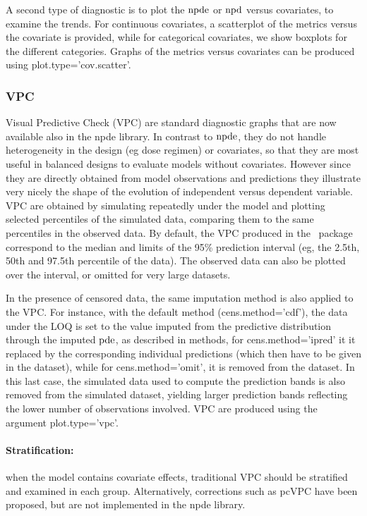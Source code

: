A second type of diagnostic is to plot the ${\rm npde}$ or ${\rm npd}$ versus covariates, to examine the trends. For 
continuous covariates, a scatterplot of the metrics versus the covariate is provided, while for categorical 
covariates, we show boxplots for the different categories. Graphs of the metrics versus covariates can be produced 
using {\sf plot.type='cov.scatter'}.

\subsubsection{VPC} 

\hskip 18pt Visual Predictive Check (VPC) are standard diagnostic graphs that are now available also in the {\sf 
npde} library. In contrast to ${\rm npde}$, they do not handle heterogeneity in the design (eg dose regimen) or 
covariates, so that they are most useful in balanced designs to evaluate models without covariates. However since 
they are directly obtained from model observations and predictions they illustrate very nicely the shape of the 
evolution of independent versus dependent variable. VPC are obtained by simulating repeatedly under the model and 
plotting selected percentiles of the simulated data, comparing them to the same percentiles in the observed data. 
By default, the VPC produced in the \npde~package correspond to the median and limits of the 95\% prediction 
interval (eg, the 2.5th, 50th and 97.5th percentile of the data). The observed data can also be plotted over the 
interval, or omitted for very large datasets.

In the presence of censored data, the same imputation method is also applied to the VPC. For instance, with the 
default method ({\sf cens.method='cdf'}), the data under the LOQ is set to the value imputed from the predictive 
distribution through the imputed ${\rm pde}$, as described in methods, for {\sf cens.method='ipred'} it it replaced by 
the corresponding individual predictions (which then have to be given in the dataset), while for {\sf 
cens.method='omit'}, it is removed from the dataset. In this last case, the simulated data used to compute the 
prediction bands is also removed from the simulated dataset, yielding larger prediction bands reflecting the lower 
number of observations involved. VPC are produced using the argument {\sf plot.type='vpc'}.

\paragraph{Stratification:} when the model contains covariate effects, traditional VPC should be stratified and 
examined in each group. Alternatively, corrections such as pcVPC have been proposed, but are not implemented in the 
{\sf npde} library. 

